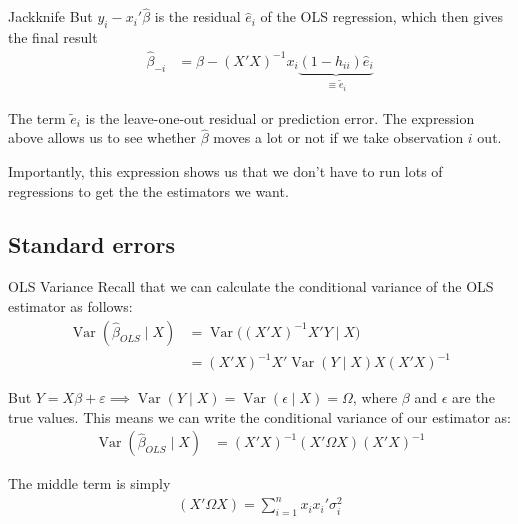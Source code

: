 \begin{frame}{Jackknife}
    But $y_i - x_i' \hat{\beta}$ is the residual $\hat{e}_i$ of the OLS regression, which then gives the final result
    \begin{align*}
        \hat{\beta}_{-i} &= \hat{\beta} - (X'X)^{-1} x_i \underbrace{(1 - h_{ii}) \hat{e}_i}_{\equiv \tilde{e}_i}
    \end{align*}

    The term $\tilde{e}_i$ is the leave-one-out residual or prediction error. The expression above allows us to see whether $\hat{\beta}$ moves a lot or not if we take observation $i$ out.

    \vspace{2em}

    Importantly, this expression shows us that we don't have to run lots of regressions to get the the estimators we want.

\end{frame}

\subsection{Standard errors}

\begin{frame}{OLS Variance}
    Recall that we can calculate the conditional variance of the OLS estimator as follows:
    \begin{align*}
        \operatorname{Var}(\hat{\beta}_{OLS} \mid X) &= \operatorname{Var}\Biggr( (X'X)^{-1} X' Y \mid X \Biggr)
        \\
        &= (X'X)^{-1} X' \operatorname{Var}(Y \mid X) X (X'X)^{-1}
    \end{align*}
    
    But $Y = X \beta + \varepsilon \implies \operatorname{Var}(Y \mid X) = \operatorname{Var}(\epsilon \mid X) = \Omega$, where $\beta$ and $\epsilon$ are the true values. This means we can write the conditional variance of our estimator as:
    \begin{align*}
        \operatorname{Var}(\hat{\beta}_{OLS} \mid X) &= (X'X)^{-1} (X' \Omega X) (X'X)^{-1}
    \end{align*}

    The middle term is simply
    \begin{align*}
        (X' \Omega X) = \sum_{i=1}^n x_i x_i' \sigma_i^2
    \end{align*}
    
\end{frame}

